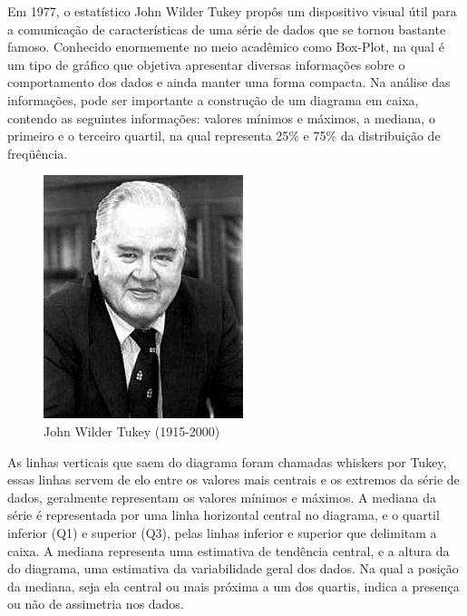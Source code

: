 \inic Em 1977, o estatístico John Wilder Tukey propôs um dispositivo visual útil
para a comunicação de características de uma série de dados que se
tornou bastante famoso. Conhecido enormemente no meio acadêmico
como Box-Plot, na qual é um tipo de gráfico que objetiva
apresentar diversas informações sobre o comportamento dos dados e
ainda manter uma forma compacta. Na análise das informações, pode
ser importante a construção de um diagrama em caixa, contendo as
seguintes informações: valores mínimos e máximos, a mediana, o
primeiro e o terceiro quartil, na qual representa 25\% e 75\% da
distribuição de freqüência.\vskip0.3cm


\vspace{-2cm}
\begin{figure}
    \centering
\includegraphics[scale=0.6]{figures/John_Tukey.jpeg}
    \caption{John Wilder Tukey (1915-2000)}
    \label{fig:my_label25}
\end{figure}







\inic As linhas verticais que saem do diagrama foram chamadas whiskers
por Tukey, essas linhas servem de elo entre os valores mais
centrais e os extremos da série de dados, geralmente representam
os valores mínimos e máximos. A mediana da série é representada
por uma linha horizontal central no diagrama, e o quartil inferior
(Q1) e superior (Q3), pelas linhas inferior e superior que
delimitam a caixa. A mediana representa uma estimativa de tendência central, e a altura da do diagrama, uma estimativa da variabilidade geral dos
dados. Na qual a posição da mediana, seja ela central ou mais
próxima a um dos quartis, indica a presença ou não de assimetria
nos dados.\vskip0.3cm


